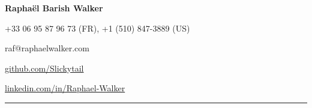 \documentclass[12pt,letterpaper]{article}
\begin{document}

{\LARGE{\textbf{Raphaël Barish Walker}}}\vspace{7pt}

\faPhone  +33 06 95 87 96 73 (FR), +1 (510) 847-3889 (US)\vspace{4pt}

\faEnvelope raf@raphaelwalker.com\vspace{4pt}

\faGithub \href{https://github.com/Slickytail}{github.com/Slickytail}\vspace{4pt}

\faLinkedinSquare \href{https://linkedin.com/in/raphael-walker}{linkedin.com/in/Raphael-Walker}\vspace{4pt}


\hrule
\end{document}
